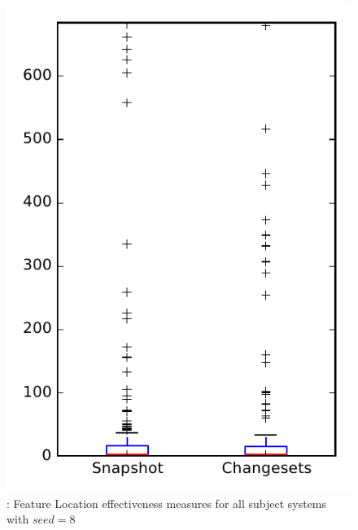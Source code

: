 
\begin{figure}
\centering
\includegraphics[height=0.4\textheight]{figures/flt_seed/rq1_overview_8}
\caption{\rone: Feature Location effectiveness measures for all subject systems with $seed=8$}
\label{fig:flt_seed:rq1:overview}
\end{figure}
